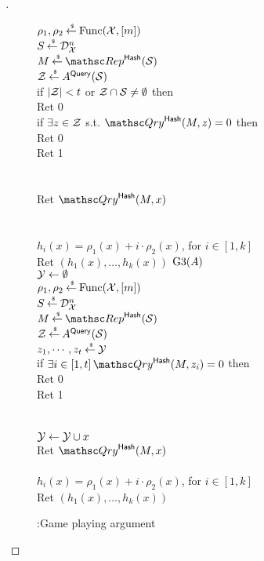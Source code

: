 \begin{proof}[]
\begin{figure}
{{$\rho_1,\rho_2 {\:\stackrel{{\scriptscriptstyle \hspace{0.2em}\$}} {\leftarrow}\:} \mathrm{Func}({\cal X},[m])$\\
$S {\:\stackrel{{\scriptscriptstyle \hspace{0.2em}\$}} {\leftarrow}\:} \mathcal{D}_{{\cal X}}^{n}$\\
$M \getsr \Rep^{\HashOracle}(\calS)$\\
${\cal Z} {\:\stackrel{{\scriptscriptstyle \hspace{0.2em}\$}} {\leftarrow}\:} A^{\mathsf{Query}}({\cal S})$\\
if $|{\cal Z}| < t$ or ${\cal Z} \cap {\cal S} \neq \emptyset$ then \\
\nudge Ret 0\\
if $\exists z \in {\cal Z}$ s.t. $\Qry^{\HashOracle}(M,z)=0$ then\\
\nudge Ret 0\\
Ret 1\\\\
%
\\
Ret $\Qry^{\HashOracle}(M,x)$\\\\
%
\\
$h_i(x) = \rho_1(x)+i \cdot \rho_2(x)$, for $i\in[1,k]$\\
Ret $\left(h_1(x),\ldots,h_k(x)\right)$
}
{
\underline{$\text{G3}(A)$}\\
${\cal Y} \gets \emptyset $\\
$\rho_1,\rho_2 {\:\stackrel{{\scriptscriptstyle \hspace{0.2em}\$}} {\leftarrow}\:} \mathrm{Func}({\cal X},[m])$\\
$S {\:\stackrel{{\scriptscriptstyle \hspace{0.2em}\$}} {\leftarrow}\:} \mathcal{D}_{{\cal X}}^{n}$\\
$M \getsr \Rep^{\HashOracle}(\calS)$\\
${\cal Z} {\:\stackrel{{\scriptscriptstyle \hspace{0.2em}\$}} {\leftarrow}\:} A^{\mathsf{Query}}({\cal S})$\\
$z_1,\cdots, z_t {\:\stackrel{{\scriptscriptstyle \hspace{0.2em}\$}} {\leftarrow}\:} {\cal Y} $\\
if $\exists i\in[1,t] \,\Qry^{\HashOracle}(M,z_i)=0$ then\\
\nudge Ret 0\\
Ret 1\\\\
%
\\
${\cal Y} \gets {\cal Y} \cup x$\\
Ret $\Qry^{\HashOracle}(M,x)$\\
%
\\
$h_i(x) = \rho_1(x)+i \cdot \rho_2(x)$, for $i\in[1,k]$\\
Ret $\left(h_1(x),\ldots,h_k(x)\right)$
}
}
\caption{:Game playing argument}\label{fig:Game}
\end{figure}


\end{proof}
